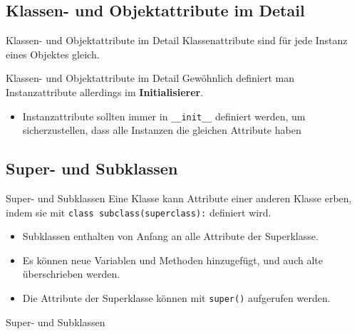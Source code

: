 \subsection{Klassen- und Objektattribute im Detail}
\begin{frame}[fragile]{Klassen- und Objektattribute im Detail}
	Klassenattribute sind für jede Instanz eines Objektes gleich.
	
\end{frame}

\begin{frame}{Klassen- und Objektattribute im Detail}
	Gewöhnlich definiert man Instanzattribute allerdings im \textbf{Initialisierer}.
	 
	\begin{itemize}
		\item Instanzattribute sollten immer in \alert{\texttt{\_\_init\_\_}} definiert werden, um sicherzustellen, dass alle Instanzen die gleichen Attribute haben
	\end{itemize}
\end{frame}

\subsection{Super- und Subklassen}
\begin{frame}[fragile]{Super- und Subklassen}
	Eine Klasse kann Attribute einer anderen Klasse erben, indem sie mit \alert{\texttt{class subclass(superclass):}} definiert wird.
	\begin{itemize}
		\item Subklassen enthalten von Anfang an alle Attribute der Superklasse.
		\item Es können neue Variablen und Methoden hinzugefügt, und auch alte überschrieben werden.
		\item Die Attribute der Superklasse können mit \alert{\texttt{super()}} aufgerufen werden.
	\end{itemize}
\end{frame}

\begin{frame}[fragile]{Super- und Subklassen}
	
\end{frame}


